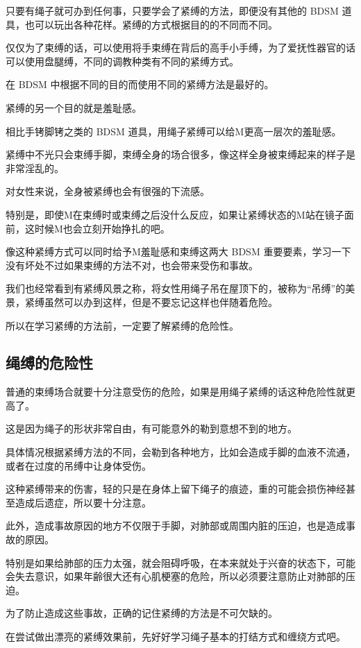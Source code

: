 \documentclass[12pt,UTF8]{ctexbook}
\begin{document}
只要有绳子就可办到任何事，只要学会了紧缚的方法，即便没有其他的 BDSM 道具，也可以玩出各种花样。紧缚的方式根据目的的不同而不同。

仅仅为了束缚的话，可以使用将手束缚在背后的高手小手缚，为了爱抚性器官的话可以使用盘腿缚，不同的调教种类有不同的紧缚方式。

在 BDSM 中根据不同的目的而使用不同的紧缚方法是最好的。

紧缚的另一个目的就是羞耻感。

相比手铐脚铐之类的 BDSM 道具，用绳子紧缚可以给M更高一层次的羞耻感。

紧缚中不光只会束缚手脚，束缚全身的场合很多，像这样全身被束缚起来的样子是非常淫乱的。

对女性来说，全身被紧缚也会有很强的下流感。

特别是，即使M在束缚时或束缚之后没什么反应，如果让紧缚状态的M站在镜子面前，这时候M也会立刻开始挣扎的吧。

像这种紧缚方式可以同时给予M羞耻感和束缚这两大 BDSM 重要要素，学习一下没有坏处不过如果束缚的方法不对，也会带来受伤和事故。

我们也经常看到有紧缚风景之称，将女性用绳子吊在屋顶下的，被称为“吊缚”的美景，紧缚虽然可以办到这样，但是不要忘记这样也伴随着危险。

所以在学习紧缚的方法前，一定要了解紧缚的危险性。

\subsection{绳缚的危险性}

普通的束缚场合就要十分注意受伤的危险，如果是用绳子紧缚的话这种危险性就更高了。

这是因为绳子的形状非常自由，有可能意外的勒到意想不到的地方。

具体情况根据紧缚方法的不同，会勒到各种地方，比如会造成手脚的血液不流通，或者在过度的吊缚中让身体受伤。

这种紧缚带来的伤害，轻的只是在身体上留下绳子的痕迹，重的可能会损伤神经甚至造成后遗症，所以要十分注意。

此外，造成事故原因的地方不仅限于手脚，对肺部或周围内脏的压迫，也是造成事故的原因。

特别是如果给肺部的压力太强，就会阻碍呼吸，在本来就处于兴奋的状态下，可能会失去意识，如果年齢很大还有心肌梗塞的危险，所以必须要注意防止对肺部的压迫。

为了防止造成这些事故，正确的记住紧缚的方法是不可欠缺的。

在尝试做出漂亮的紧缚效果前，先好好学习绳子基本的打结方式和缠绕方式吧。
\end{document}
